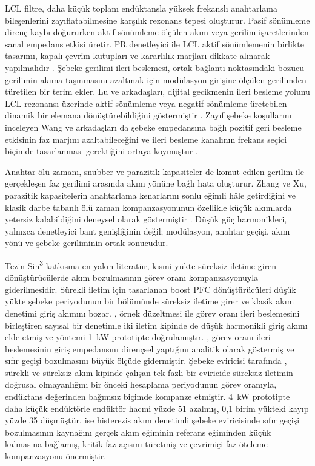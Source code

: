 LCL filtre, daha küçük toplam endüktansla yüksek frekanslı anahtarlama bileşenlerini zayıflatabilmesine karşılık rezonans tepesi oluşturur. Pasif sönümleme direnç kaybı doğururken aktif sönümleme ölçülen akım veya gerilim işaretlerinden sanal empedans etkisi üretir. PR denetleyici ile LCL aktif sönümlemenin birlikte tasarımı, kapalı çevrim kutupları ve kararlılık marjları dikkate alınarak yapılmalıdır \citep{Zhang2014PR}. Şebeke gerilimi ileri beslemesi, ortak bağlantı noktasındaki bozucu gerilimin akıma taşınmasını azaltmak için modülasyon girişine ölçülen gerilimden türetilen bir terim ekler. Lu ve arkadaşları, dijital gecikmenin ileri besleme yolunu LCL rezonansı üzerinde aktif sönümleme veya negatif sönümleme üretebilen dinamik bir elemana dönüştürebildiğini göstermiştir \citep{Lu2016}. Zayıf şebeke koşullarını inceleyen Wang ve arkadaşları da şebeke empedansına bağlı pozitif geri besleme etkisinin faz marjını azaltabileceğini ve ileri besleme kanalının frekans seçici biçimde tasarlanması gerektiğini ortaya koymuştur \citep{Wang2024}.

Anahtar ölü zamanı, snubber ve parazitik kapasiteler de komut edilen gerilim ile gerçekleşen faz gerilimi arasında akım yönüne bağlı hata oluşturur. Zhang ve Xu, parazitik kapasitelerin anahtarlama kenarlarını sonlu eğimli hâle getirdiğini ve klasik darbe tabanlı ölü zaman kompanzasyonunun özellikle küçük akımlarda yetersiz kalabildiğini deneysel olarak göstermiştir \citep{Zhang2014Deadtime}. Düşük güç harmonikleri, yalnızca denetleyici bant genişliğinin değil; modülasyon, anahtar geçişi, akım yönü ve şebeke geriliminin ortak sonucudur.

Tezin Sin\textsuperscript{3} katkısına en yakın literatür, kısmi yükte süreksiz iletime giren dönüştürücülerde akım bozulmasının görev oranı kompanzasyonuyla giderilmesidir. Sürekli iletim için tasarlanan boost PFC dönüştürücüleri düşük yükte şebeke periyodunun bir bölümünde süreksiz iletime girer ve klasik akım denetimi giriş akımını bozar. \citet{DeGusseme2005}, örnek düzeltmesi ile görev oranı ileri beslemesini birleştiren sayısal bir denetimle iki iletim kipinde de düşük harmonikli giriş akımı elde etmiş ve yöntemi \SI{1}{\kilo\watt} prototipte doğrulamıştır. \citet{VanDeSype2005}, görev oranı ileri beslemesinin giriş empedansını dirençsel yaptığını analitik olarak göstermiş ve sıfır geçişi bozulmasını büyük ölçüde gidermiştir. Şebeke eviricisi tarafında \citet{Le2019}, sürekli ve süreksiz akım kipinde çalışan tek fazlı bir eviricide süreksiz iletimin doğrusal olmayanlığını bir önceki hesaplama periyodunun görev oranıyla, endüktans değerinden bağımsız biçimde kompanze etmiştir. \SI{4}{\kilo\watt} prototipte daha küçük endüktörle endüktör hacmi yüzde 51 azalmış, 0,1 birim yükteki kayıp yüzde 35 düşmüştür. \citet{Wu2013} ise histerezis akım denetimli şebeke eviricisinde sıfır geçişi bozulmasının kaynağını gerçek akım eğiminin referans eğiminden küçük kalmasına bağlamış, kritik faz açısını türetmiş ve çevrimiçi faz öteleme kompanzasyonu önermiştir.

